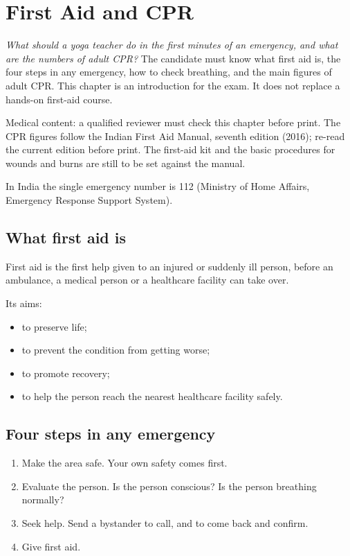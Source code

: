 \chapter{First Aid and CPR}\label{ch:first-aid-cpr}

\emph{What should a yoga teacher do in the first minutes of an emergency, and what are the numbers of adult CPR?}
The candidate must know what first aid is, the four steps in any emergency, how to check breathing, and the main figures of adult CPR. This chapter is an introduction for the exam. It does not replace a hands-on first-aid course.

\begin{unverified}
Medical content: a qualified reviewer must check this chapter before print. The CPR figures follow the Indian First Aid Manual, seventh edition (2016); re-read the current edition before print. The first-aid kit and the basic procedures for wounds and burns are still to be set against the manual.
\end{unverified}

In India the single emergency number is 112 (Ministry of Home Affairs, Emergency Response Support System).

\section*{What first aid is}

First aid is the first help given to an injured or suddenly ill person, before an ambulance, a medical person or a healthcare facility can take over.

Its aims:
\begin{itemize}
\item to preserve life;
\item to prevent the condition from getting worse;
\item to promote recovery;
\item to help the person reach the nearest healthcare facility safely.
\end{itemize}

\section*{Four steps in any emergency}

\begin{enumerate}
\item Make the area safe. Your own safety comes first.
\item Evaluate the person. Is the person conscious? Is the person breathing normally?
\item Seek help. Send a bystander to call, and to come back and confirm.
\item Give first aid.
\end{enumerate}

